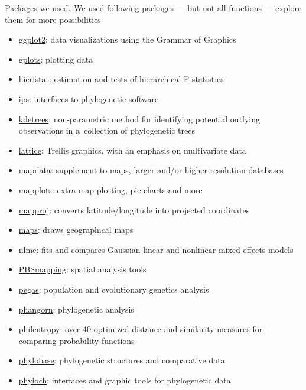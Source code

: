 \documentclass[compress, xelatex, 11pt, xcolor=svgnames, aspectratio=169,
	hyperref={
		bookmarks=true,
		unicode=true,
		colorlinks=true,
		pdftitle={Molecular data in R},
		plainpages=false,
		pdfauthor={Vojtech Zeisek},
		pdfsubject={Course about phylogeny and evolution in R},
		pdfcreator={XeLaTeX},
		pdfkeywords={R, evolution, phylogeny, molecular data},
		linkcolor=Crimson, %
		anchorcolor=Magenta, %
		citecolor=Magenta, %
		filecolor=Magenta, %
		menucolor=Magenta, %
		urlcolor=DodgerBlue, %
		},
	url={hyphens, lowtilde} %
	]{beamer}
\begin{document}
\begin{frame}[allowframebreaks]{Packages we used\ldots}{We used following packages --- but not all functions --- explore them for more possibilities}
\begin{itemize}
		\item \href{https://CRAN.R-project.org/package=ggplot2}{ggplot2}: data visualizations using the Grammar of Graphics
		\item \href{https://CRAN.R-project.org/package=gplots}{gplots}: plotting data
		\item \href{https://CRAN.R-project.org/package=hierfstat}{hierfstat}: estimation and tests of hierarchical F-statistics
		\item \href{https://CRAN.R-project.org/package=ips}{ips}: interfaces to phylogenetic software
		\item \href{https://github.com/V-Z/kdetrees}{kdetrees}: non-parametric method for identifying potential outlying observations in a~collection of phylogenetic trees
		\item \href{https://CRAN.R-project.org/package=lattice}{lattice}: Trellis graphics, with an emphasis on multivariate data
		\item \href{https://CRAN.R-project.org/package=mapdata}{mapdata}: supplement to maps, larger and/or higher-resolution databases
		\item \href{https://CRAN.R-project.org/package=mapplots}{mapplots}: extra map plotting, pie charts and more
		\item \href{https://CRAN.R-project.org/package=mapproj}{mapproj}: converts latitude/longitude into projected coordinates
		\item \href{https://CRAN.R-project.org/package=maps}{maps}: draws geographical maps
		\item \href{https://CRAN.R-project.org/package=nlme}{nlme}: fits and compares Gaussian linear and nonlinear mixed-effects models
		\item \href{https://CRAN.R-project.org/package=PBSmapping}{PBSmapping}: spatial analysis tools
		\item \href{https://CRAN.R-project.org/package=pegas}{pegas}: population and evolutionary genetics analysis
		\item \href{https://CRAN.R-project.org/package=phangorn}{phangorn}: phylogenetic analysis
		\item \href{https://CRAN.R-project.org/package=philentropy}{philentropy}: over 40 optimized distance and similarity measures for comparing probability functions
		\item \href{https://CRAN.R-project.org/package=phylobase}{phylobase}: phylogenetic structures and comparative data
		\item \href{http://www.christophheibl.de/Rpackages.html}{phyloch}: interfaces and graphic tools for phylogenetic data

\end{itemize}
\end{frame}
\end{document}
